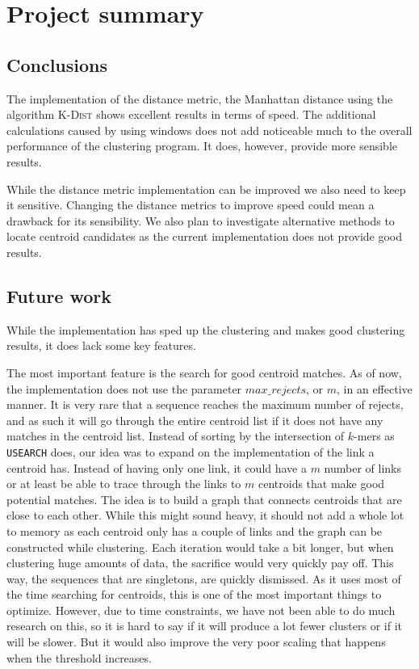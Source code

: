 \section{Project summary}

\subsection{Conclusions}
\label{sec:conclusions}

The implementation of the distance metric, the Manhattan distance using the
algorithm \textsc{K-Dist} shows excellent results in terms of speed. The
additional calculations caused by using windows does not add noticeable much
to the overall performance of the clustering program. It does, however,
provide more sensible results.

While the distance metric implementation can be improved we also need to keep
it sensitive. Changing the distance metrics to improve speed could mean a
drawback for its sensibility. We also plan to investigate alternative methods
to locate centroid candidates as the current implementation does not provide
good results.

\subsection{Future work}
\label{sec:future_work}

While the implementation has sped up the clustering and makes good clustering
results, it does lack some key features.

The most important feature is the search for good centroid matches. As of now,
the implementation does not use the parameter $max\_rejects$, or $m$, in an
effective manner. It is very rare that a sequence reaches the maximum number
of rejects, and as such it will go through the entire centroid list if it does
not have any matches in the centroid list. Instead of sorting by the
intersection of $k$-mers as \texttt{USEARCH} does, our idea was to expand
on the implementation of the link a centroid has. Instead of having only one
link, it could have a $m$ number of links or at least be able to trace through
the links to $m$ centroids that make good potential matches. The idea is to
build a graph that connects centroids that are close to each other. While this
might sound heavy, it should not add a whole lot to memory as each centroid
only has a couple of links and the graph can be constructed while clustering.
Each iteration would take a bit longer, but when clustering huge amounts of
data, the sacrifice would very quickly pay off. This way, the sequences that
are singletons, are quickly dismissed. As it uses most of the time searching
for centroids, this is one of the most important things to optimize. However,
due to time constraints, we have not been able to do much research on this, so
it is hard to say if it will produce a lot fewer clusters or if it will be
slower. But it would also improve the very poor scaling that happens when the
threshold increases.

